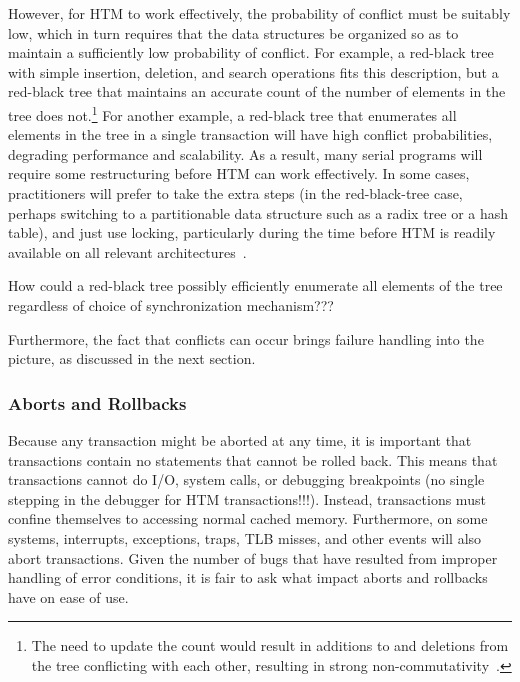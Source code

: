 However, for HTM to work effectively, the probability of conflict must
be suitably low, which in turn requires that the data structures
be organized so as to maintain a sufficiently low probability of conflict.
For example, a red-black tree with simple insertion, deletion, and search
operations fits this description, but a red-black
tree that maintains an accurate count of the number of elements in
the tree does not.\footnote{
	The need to update the count would result in additions to and
	deletions from the tree conflicting with each other, resulting
	in strong non-commutativity~\cite{HagitAttiya2011LawsOfOrder,PaulEMcKenney2011SNC}.}
For another example, a red-black tree that enumerates all elements in
the tree in a single transaction will have high conflict probabilities,
degrading performance and scalability.
As a result, many serial programs will require some restructuring before
HTM can work effectively.
In some cases, practitioners will prefer to take the extra steps
(in the red-black-tree case, perhaps switching to a partitionable
data structure such as a radix tree or a hash table), and just
use locking, particularly during the time before HTM is readily available
on all relevant
architectures~\cite{CliffClick2009AzulHTM}.

\QuickQuiz{}
	How could a red-black tree possibly efficiently enumerate all
	elements of the tree regardless of choice of synchronization
	mechanism???
 \QuickQuizEnd

Furthermore, the fact that conflicts can occur brings failure handling
into the picture, as discussed in the next section.

\subsubsection{Aborts and Rollbacks}
\label{sec:future:Aborts and Rollbacks}

Because any transaction might be aborted at any time, it is important
that transactions contain no statements that cannot be rolled back.
This means that transactions cannot do I/O, system calls, or debugging
breakpoints (no single stepping in the debugger for HTM transactions!!!).
Instead, transactions must confine themselves to accessing normal
cached memory.
Furthermore, on some systems, interrupts, exceptions, traps,
TLB misses, and other events will also abort transactions.
Given the number of bugs that have resulted from improper handling
of error conditions, it is fair to ask what impact aborts and rollbacks
have on ease of use.

